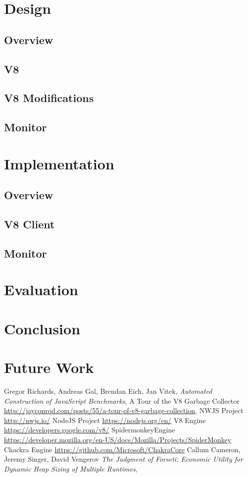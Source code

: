 \documentclass[a4paper]{article}
\begin{document}
\section{Design}
\subsection{Overview}
\subsection{V8}
\subsection{V8 Modifications}
\subsection{Monitor}
\section{Implementation}
\subsection{Overview}
\subsection{V8 Client}
\subsection{Monitor}
\section{Evaluation}
\section{Conclusion}
\section{Future Work}

\begin{thebibliography}{9}
  Gregor Richards, Andreas Gal, Brendan Eich, Jan Vitek,
  \emph{Automated Construction of JavaScript Benchmarks},
A Tour of the V8 Garbage Collector
\url{http://jayconrod.com/posts/55/a-tour-of-v8-garbage-collection},
  NWJS Project
  \url{http://nwjs.io/}
  NodeJS Project
  \url{https://nodejs.org/en/}
  V8 Engine
  \url{https://developers.google.com/v8/}
SpidermonkeyEngine
\url{https://developer.mozilla.org/en-US/docs/Mozilla/Projects/SpiderMonkey}
Chackra Engine
\url{https://github.com/Microsoft/ChakraCore}
  Callum Cameron, Jeremy Singer, David Vengerov
  \emph{The Judgment of Forseti: Economic Utility for Dynamic Heap Sizing of Multiple Runtimes},  
\end{thebibliography}
\end{document}

